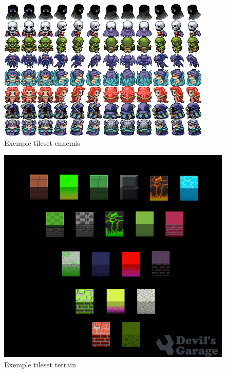\documentclass[a4paper,12pt]{article}
\begin{document}
    \begin{figure}[ht]
        \centering
        \includegraphics{monsters-32x32.png}
        \caption{Exemple tileset ennemis}
    \end{figure}
    
    \begin{figure}[ht]
        \centering
        \includegraphics[width=\textwidth]{field.png}
        \caption{Exemple tileset terrain}
    \end{figure}
    
\end{document}
